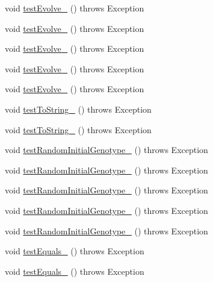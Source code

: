\begin{DoxyCompactItemize}
\item 
void \hyperlink{classorg_1_1jgap_1_1_genotype_test_ad92de3d7ef3419b937a0c78e12504ac1}{test\-Evolve\-\_} ()  throws Exception 
\item 
void \hyperlink{classorg_1_1jgap_1_1_genotype_test_ae23cf149004c0b012d0688afa658ebc4}{test\-Evolve\-\_} ()  throws Exception 
\item 
void \hyperlink{classorg_1_1jgap_1_1_genotype_test_a50f8d4de41e9fbf7d86f8c500a598848}{test\-Evolve\-\_} ()  throws Exception 
\item 
void \hyperlink{classorg_1_1jgap_1_1_genotype_test_acb9d18607cde3ec89f75102ff33e75c8}{test\-Evolve\-\_} ()  throws Exception 
\item 
void \hyperlink{classorg_1_1jgap_1_1_genotype_test_a6e4d2a3cbc693b9132f37175c2a7a57d}{test\-Evolve\-\_} ()  throws Exception 
\item 
void \hyperlink{classorg_1_1jgap_1_1_genotype_test_a2b130f8441d61be9693d58c032758433}{test\-To\-String\-\_} ()  throws Exception 
\item 
void \hyperlink{classorg_1_1jgap_1_1_genotype_test_af9886775798893fbf9ec793db77e262e}{test\-To\-String\-\_} ()  throws Exception 
\item 
void \hyperlink{classorg_1_1jgap_1_1_genotype_test_a60e2cd555aa9bebf0566e41cda7d5780}{test\-Random\-Initial\-Genotype\-\_} ()  throws Exception 
\item 
void \hyperlink{classorg_1_1jgap_1_1_genotype_test_ad352e4448b6134366234b16ce8d55ea3}{test\-Random\-Initial\-Genotype\-\_} ()  throws Exception 
\item 
void \hyperlink{classorg_1_1jgap_1_1_genotype_test_a5e6a6ad1dc3ba752999cf6958c928441}{test\-Random\-Initial\-Genotype\-\_} ()  throws Exception 
\item 
void \hyperlink{classorg_1_1jgap_1_1_genotype_test_af0a0ef475435e49ee885da4f43d2cd5e}{test\-Random\-Initial\-Genotype\-\_} ()  throws Exception 
\item 
void \hyperlink{classorg_1_1jgap_1_1_genotype_test_a477fbbcef090415ffbb7beec7a796d5e}{test\-Random\-Initial\-Genotype\-\_} ()  throws Exception 
\item 
void \hyperlink{classorg_1_1jgap_1_1_genotype_test_a3bda1262138124ac8f700d3bcacd9773}{test\-Equals\-\_} ()  throws Exception 
\item 
void \hyperlink{classorg_1_1jgap_1_1_genotype_test_ac3552c052aef7ea315419c4168f4b2c5}{test\-Equals\-\_} ()  throws Exception 
\item 

\end{DoxyCompactItemize}
